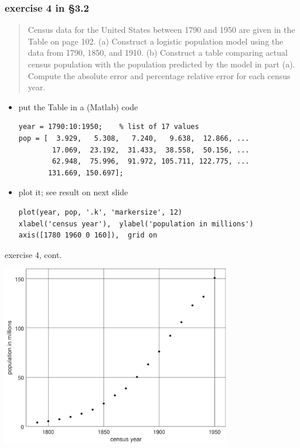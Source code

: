\documentclass{beamer}
\begin{document}
\begin{frame}[fragile]

\frametitle{exercise 4 in \S3.2}

\small
\begin{quotation}
\noindent Census data for the United States between 1790 and 1950 are given in the Table on page 102.  (a)  Construct a logistic population model using the data from 1790, 1850, and 1910.  (b)  Construct a table comparing actual census population with the population predicted by the model in part (a).  Compute the absolute error and percentage relative error for each census year. 
\end{quotation}

\normalsize
\begin{itemize}
\item put the Table in a (Matlab) code

\begin{Verbatim}[fontsize=\scriptsize]
year = 1790:10:1950;    % list of 17 values
pop = [  3.929,   5.308,   7.240,   9.638,  12.866, ...
        17.069,  23.192,  31.433,  38.558,  50.156, ...
        62.948,  75.996,  91.972, 105.711, 122.775, ...
       131.669, 150.697];
\end{Verbatim}

\item plot it; see result on next slide

\begin{Verbatim}[fontsize=\scriptsize]
plot(year, pop, '.k', 'markersize', 12)
xlabel('census year'),  ylabel('population in millions')
axis([1780 1960 0 160]),  grid on
\end{Verbatim}
\end{itemize}
\end{frame}


\begin{frame}{exercise 4, cont.}

\begin{center}
\includegraphics[width=0.75\textwidth]{figs/uscensus}
\end{center}
\end{frame}
\end{document}
